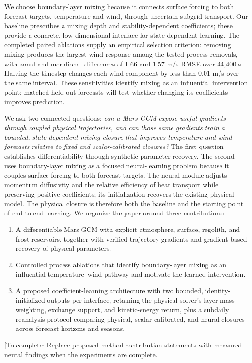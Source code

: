 \documentclass{article}
\newcommand{\pending}[1]{\textcolor{blue!65!black}{[To complete: #1]}}
\begin{document}
We choose boundary-layer mixing because it connects surface forcing to both
forecast targets, temperature and wind, through uncertain subgrid transport.
Our baseline prescribes a mixing depth and stability-dependent coefficients;
these provide a concrete, low-dimensional interface for state-dependent
learning. The completed paired ablations supply an empirical selection
criterion: removing mixing produces the largest wind response among the tested
process removals, with zonal and meridional differences of 1.66 and 1.57 m/s
RMSE over 44,400 s. Halving the timestep changes each wind component by less
than 0.01 m/s over the same interval. These sensitivities identify mixing as
an influential intervention point; matched held-out forecasts will test
whether changing its coefficients improves prediction.

We ask two connected questions: \emph{can a Mars GCM expose useful gradients
through coupled physical trajectories, and can those same gradients train a
bounded, state-dependent mixing closure that improves temperature and wind
forecasts relative to fixed and scalar-calibrated closures?} The first question
establishes differentiability through synthetic parameter recovery. The second
uses boundary-layer mixing as a focused neural-learning problem because it
couples surface forcing to both forecast targets. The neural module adjusts
momentum diffusivity and the relative efficiency of heat transport while
preserving positive coefficients; its initialization recovers the existing
physical model. The physical closure is therefore both the baseline and the
starting point of end-to-end learning. We organize the paper around three
contributions:
\begin{enumerate}
\item A differentiable Mars GCM with explicit atmosphere, surface, regolith,
and frost reservoirs, together with verified trajectory gradients and
gradient-based recovery of physical parameters.
\item Controlled process ablations that identify boundary-layer mixing as an
influential temperature--wind pathway and motivate the learned intervention.
\item A proposed coefficient-learning architecture with two bounded,
identity-initialized outputs per interface, retaining the physical solver's
layer-mass weighting, exchange support, and kinetic-energy return, plus a
subdaily reanalysis protocol comparing physical, scalar-calibrated, and neural
closures across forecast horizons and seasons.
\end{enumerate}
\pending{Replace proposed-method contribution statements with measured neural
findings when the experiments are complete.}
\end{document}

